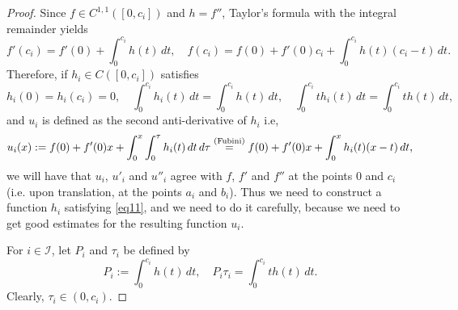 \documentclass[intlimits,12pt,reqno]{amsart}
\theoremstyle{definition}
\begin{document}
\begin{proof}
Since $f\in C^{1,1}([0,c_i])$ and $h=f''$, Taylor's formula with the integral remainder yields
$$
f'(c_i)=f'(0)+\int_0^{c_i} h(t)\, dt,
\quad
f(c_i)=f(0)+f'(0)c_i+\int_0^{c_i} h(t)(c_i-t)\, dt.
$$
Therefore, if $h_i\in C([0,c_i])$ satisfies
\begin{equation}
\label{eq11}
h_i(0)=h_i(c_i)=0,
\quad
\int_0^{c_i} h_i(t)\, dt=\int_0^{c_i} h(t)\, dt,
\quad
\int_0^{c_i} t h_i(t)\, dt=\int_0^{c_i} t h(t)\, dt,
\end{equation}
and $u_i$ is defined as the second anti-derivative of $h_i$ i.e,
\begin{equation}
\label{eq15}
u_i(x):=f(0)+f'(0)x+\int_0^x\int_0^\tau h_i(t)\, dt\, d\tau\stackrel{{\rm(Fubini)}}{=}
f(0)+f'(0)x+\int_0^x h_i(t)(x-t)\, dt,
\end{equation}
we will have that $u_i$, $u'_i$ and $u''_i$ agree with $f$, $f'$ and $f''$ at the points $0$ and $c_i$ (i.e. upon translation, at the points $a_i$ and $b_i$).
Thus we need to construct a function $h_i$ satisfying \eqref{eq11}, and we need to do it carefully, because we need to get good estimates for the resulting function $u_i$.




For $i\in\mathcal{I}$, let $P_i$ and $\tau_i$ be defined by
$$
P_i:=\int_0^{c_i} h(t)\, dt,
\quad
P_i\tau_i=\int_0^{c_i}th(t)\, dt.
$$
Clearly, $\tau_i\in (0,c_i)$.


\end{proof}
\end{document}
